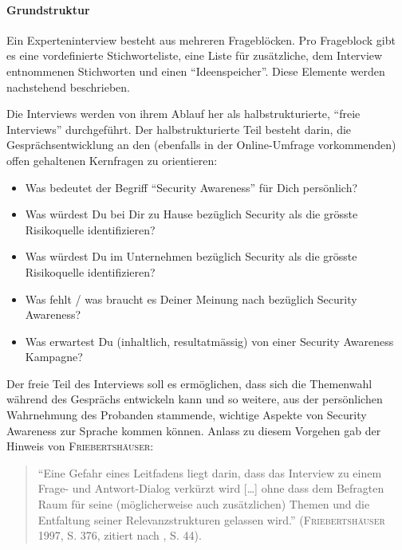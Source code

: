 \documentclass[../../main.tex]{subfiles}
\begin{document}
\paragraph*{Grundstruktur}\mbox{}

\begin{sloppypar}
Ein Experteninterview besteht aus mehreren Frageblöcken. Pro Frageblock gibt es eine vordefinierte Stichworteliste, eine Liste für zusätzliche, dem Interview entnommenen Stichworten und einen "`Ideenspeicher"'. Diese Elemente werden nachstehend beschrieben.

Die Interviews werden von ihrem Ablauf her als halbstrukturierte, "`freie Interviews"' durchgeführt. Der halbstrukturierte Teil besteht darin, die Gesprächsentwicklung an den (ebenfalls in der Online-Umfrage vorkommenden) offen gehaltenen Kernfragen zu orientieren:

\begin{itemize}
  \item Was bedeutet der Begriff "`Security Awareness"' für Dich persönlich?
  \item Was würdest Du bei Dir zu Hause bezüglich Security als die grösste Risikoquelle identifizieren? 
  \item Was würdest Du im Unternehmen bezüglich Security als die grösste Risikoquelle identifizieren?
  \item Was fehlt / was braucht es Deiner Meinung nach bezüglich Security Awareness?
  \item Was erwartest Du (inhaltlich, resultatmässig) von einer Security Awareness Kampagne?
\end{itemize}

Der freie Teil des Interviews soll es ermöglichen, dass sich die Themenwahl während des Gesprächs entwickeln kann und so weitere, aus der persönlichen Wahrnehmung des Probanden stammende, wichtige Aspekte von Security Awareness zur Sprache kommen können. Anlass zu diesem Vorgehen gab der Hinweis von \textsc{Friebertshäuser}:

\begin{quote}
"`Eine Gefahr eines Leitfadens liegt darin, dass das Interview zu einem Frage- und Antwort-Dialog verkürzt wird [\dots] ohne dass dem Befragten Raum für seine (möglicherweise auch zusätzlichen) Themen und die Entfaltung seiner Relevanzstrukturen gelassen wird."' (\textsc{Friebertshäuser} 1997, S. 376, zitiert nach \cite{mayer_interview_2013}, S. 44).
\end{quote}

\end{sloppypar}
\end{document}
